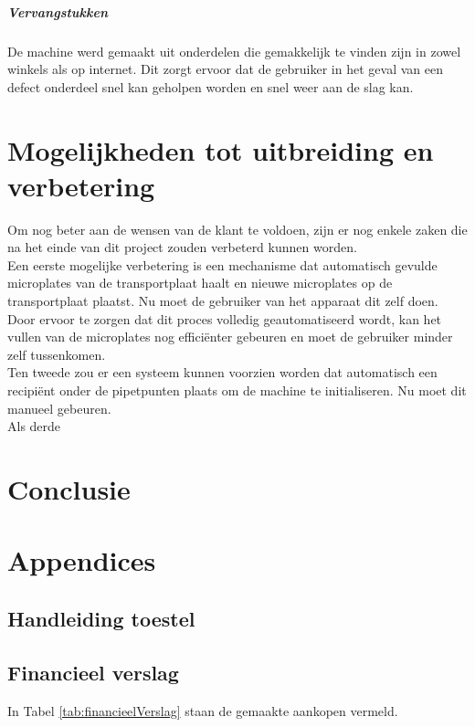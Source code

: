 \documentclass[a4paper,twoside,kulak]{kulakreport} %
\begin{document}
\paragraph{Vervangstukken}

De machine werd gemaakt uit onderdelen die gemakkelijk te vinden zijn in zowel winkels als op internet. Dit zorgt ervoor dat de gebruiker in het geval van een defect onderdeel snel kan geholpen worden en snel weer aan de slag kan.

\chapter{Mogelijkheden tot uitbreiding en verbetering}

Om nog beter aan de wensen van de klant te voldoen, zijn er nog enkele zaken die na het einde van dit project zouden verbeterd kunnen worden. \\
Een eerste mogelijke verbetering is een mechanisme dat automatisch gevulde microplates  van de transportplaat haalt en nieuwe microplates op de transportplaat plaatst. Nu moet de gebruiker van het apparaat dit zelf doen. Door ervoor te zorgen dat dit proces volledig geautomatiseerd wordt, kan het vullen van de microplates nog efficiënter gebeuren en moet de gebruiker minder zelf tussenkomen. \\
Ten tweede zou er een systeem kunnen voorzien worden dat automatisch een recipiënt onder de pipetpunten plaats om de machine te initialiseren. Nu moet dit manueel gebeuren. \\
Als derde 

\chapter{Conclusie}

\chapter*{Appendices}

\section*{Handleiding toestel}

\section*{Financieel verslag}
\label{Appendix: Financieel verslag}

In Tabel \ref{tab:financieelVerslag} staan de gemaakte aankopen vermeld. 
\end{document}
